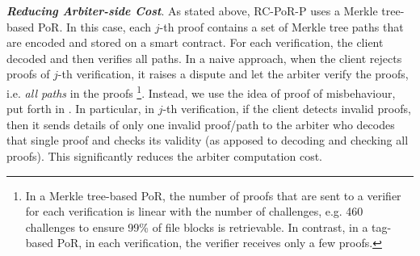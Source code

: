\noindent\textit{\textbf{Reducing Arbiter-side Cost}}.  As stated above, RC-PoR-P uses a Merkle tree-based PoR. In this case, each $j$-th proof contains a set of Merkle tree paths that are encoded and stored on a smart contract. For each verification, the client decoded and then verifies all paths. In a naive approach, when the client rejects  proofs of $j$-th verification,  it raises a dispute and let the arbiter verify the proofs, i.e. \emph{all paths} in the proofs \footnote{In a Merkle tree-based PoR, the number of proofs that are sent to a verifier for each verification is linear with the number of challenges, e.g. 460 challenges  to ensure 99\% of file blocks is retrievable. In contrast, in a tag-based PoR, in each verification, the verifier receives only a few proofs.}. Instead, we use the idea of proof of misbehaviour, put forth in \cite{}. In particular, in $j$-th verification, if the client detects invalid proofs, then  it  sends  details of only one invalid proof/path to the arbiter  who  decodes that single proof and checks its validity (as apposed to decoding and checking all proofs). This significantly reduces the arbiter computation cost. 

